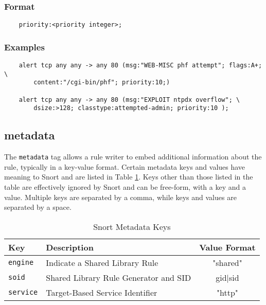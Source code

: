 \documentclass[english]{report}
\begin{document}
\subsubsection{Format}

\begin{verbatim}
    priority:<priority integer>;
\end{verbatim}

\subsubsection{Examples}

\begin{verbatim}
    alert tcp any any -> any 80 (msg:"WEB-MISC phf attempt"; flags:A+; \
        content:"/cgi-bin/phf"; priority:10;)

    alert tcp any any -> any 80 (msg:"EXPLOIT ntpdx overflow"; \ 
        dsize:>128; classtype:attempted-admin; priority:10 );
\end{verbatim}

\subsection{metadata}

The \texttt{metadata} tag allows a rule writer to embed additional information
about the rule, typically in a key-value format.  Certain metadata keys and
values have meaning to Snort and are listed in Table \ref{Snort Metadata Keys}.
Keys other than those listed in the table are effectively ignored by Snort and
can be free-form, with a key and a value.  Multiple keys are separated by a
comma, while keys and values are separated by a space.

\begin{table}[h]
\begin{center}
\caption{Snort Metadata Keys}
\label{Snort Metadata Keys}
\begin{tabular}{|p{1in}|p{2.5in}|c|}

\hline 
Key & Description & Value Format \\
\hline

\hline
\texttt{engine} &
Indicate a Shared Library Rule & "shared" \\

\hline 
\texttt{soid} &
Shared Library Rule Generator and SID & gid$|$sid \\

\hline 
\texttt{service} &
Target-Based Service Identifier & "http" \\

\hline 
\end{tabular}
\end{center}
\end{table}
\end{document}

